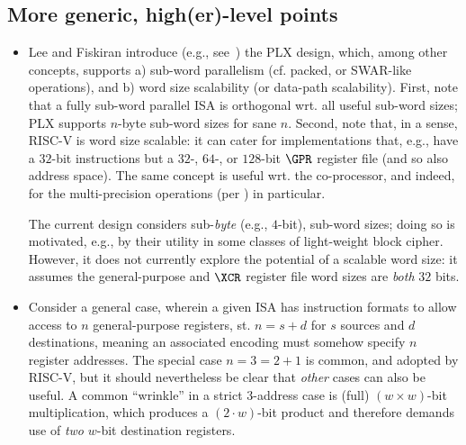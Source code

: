 
\subsection{More  generic, high(er)-level points}
\label{appx:discuss:hi}

\begin{itemize}

\item Lee and Fiskiran introduce (e.g., see~\cite{SCARV:LeeFis:05}) the PLX
      design, which, among other concepts, supports 
      a) sub-word parallelism (cf. packed, or SWAR-like operations),
         and
      b) word size scalability (or data-path scalability).
      First, 
      note that a fully sub-word parallel ISA is orthogonal wrt. all useful
      sub-word sizes; PLX supports $n$-byte sub-word sizes for sane $n$.
      Second,
      note that, in a sense, RISC-V is word size scalable: it can cater for
      implementations that, e.g., have a $32$-bit instructions but a $32$-,
      $64$-, or $128$-bit $\GPR$ register file (and so also address space). 
      The same concept is useful wrt. the co-processor, and indeed, for the
      multi-precision operations
      (per )
      in particular.

      The current design considers sub-{\em byte} (e.g., $4$-bit), sub-word
      sizes; doing so is motivated, e.g., by their utility in some classes 
      of light-weight block cipher.  However, it does not currently explore 
      the potential of a scalable word size: it assumes the general-purpose
      and $\XCR$ register file word sizes are {\em both} $32$ bits.

\item Consider a general case, wherein a given ISA has instruction formats
      to allow access to $n$ general-purpose registers, st. 
      $
      n = s + d
      $ 
      for $s$ sources and $d$ destinations, meaning an associated encoding 
      must somehow specify $n$ register addresses.  The special case
      $
      n = 3 = 2 + 1 
      $
      is common, and adopted by RISC-V, but it should nevertheless be clear
      that {\em other} cases can also be useful.  A common ``wrinkle'' in a 
      strict $3$-address case is (full) $( w \times w )$-bit multiplication, 
      which produces a $(2 \cdot w )$-bit product and therefore demands use 
      of {\em two} $w$-bit destination registers.
   

\end{itemize}
